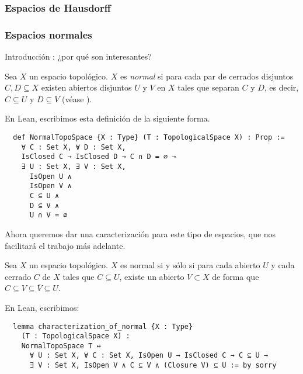 \subsubsection{Espacios de Hausdorff}

\newpage
\subsubsection{Espacios normales}

Introducción : ¿por qué son interesantes?

\begin{definition}
  Sea $X$ un espacio topológico. $X$ es \emph{normal} si para cada par de cerrados disjuntos $C, D \subseteq X$ existen abiertos disjuntos $U$ y $V$ en $X$ tales  que separan $C$ y $D$, es decir, $C \subseteq U$ y $D \subseteq V$ \textnormal{(véase \cite[p. 99]{willard2012general})}.
\end{definition}

En Lean, escribimos esta definición de la siguiente forma.

\begin{lstlisting}
  def NormalTopoSpace {X : Type} (T : TopologicalSpace X) : Prop :=
    ∀ C : Set X, ∀ D : Set X,
    IsClosed C → IsClosed D → C ∩ D = ∅ →
    ∃ U : Set X, ∃ V : Set X,
      IsOpen U ∧
      IsOpen V ∧
      C ⊆ U ∧
      D ⊆ V ∧
      U ∩ V = ∅
\end{lstlisting}

Ahora queremos dar una caracterización para este tipo de espacios, que nos facilitará el trabajo más adelante.

\begin{proposition}
  Sea $X$ un espacio topológico. $X$ es normal si y sólo si para cada abierto $U$ y cada cerrado $C$ de $X$ tales que $C \subseteq U$, existe un abierto $V \subset X$ de forma que $C \subseteq V \subseteq \overline{V} \subseteq U$.
\end{proposition}

En Lean, escribimos:

\begin{lstlisting}
  lemma characterization_of_normal {X : Type}
    (T : TopologicalSpace X) :
    NormalTopoSpace T ↔
      ∀ U : Set X, ∀ C : Set X, IsOpen U → IsClosed C → C ⊆ U →
      ∃ V : Set X, IsOpen V ∧ C ⊆ V ∧ (Closure V) ⊆ U := by sorry
\end{lstlisting}

